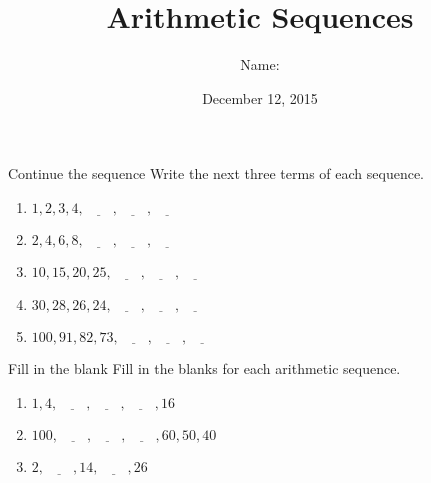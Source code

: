 \documentclass[12pt,letterpaper]{article}
\title{Arithmetic Sequences}
\author{Name: \underline{\hspace{5cm}}}
\date{December 12, 2015}
\begin{document}
\maketitle

\thispagestyle{empty}

\begin{problem}{Continue the sequence}
 Write the next three terms of each sequence.

\begin{enumerate}[\hspace{.5cm}a.]
\item $1, 2, 3, 4, \underline{\hspace{2em}}, \underline{\hspace{2em}},
\underline{\hspace{2em}}$
\item $2, 4, 6, 8, \underline{\hspace{2em}}, \underline{\hspace{2em}},
\underline{\hspace{2em}}$
\item $10, 15, 20, 25, \underline{\hspace{2em}}, \underline{\hspace{2em}},
\underline{\hspace{2em}}$
\item $30, 28, 26, 24, \underline{\hspace{2em}}, \underline{\hspace{2em}},
\underline{\hspace{2em}}$
\item $100, 91, 82, 73, \underline{\hspace{2em}}, \underline{\hspace{2em}},
\underline{\hspace{2em}}$
\end{enumerate}
\end{problem}

\begin{problem}{Fill in the blank}
 Fill in the blanks for each arithmetic sequence.

\begin{enumerate}[\hspace{.5cm}a.]
\item $1, 4, \underline{\hspace{2em}}, \underline{\hspace{2em}},
\underline{\hspace{2em}}, 16$
\item $100, \underline{\hspace{2em}}, \underline{\hspace{2em}},
\underline{\hspace{2em}}, 60, 50, 40$
\item $2, \underline{\hspace{2em}}, 14, \underline{\hspace{2em}}, 26$
\end{enumerate}
\end{problem}
\end{document}

